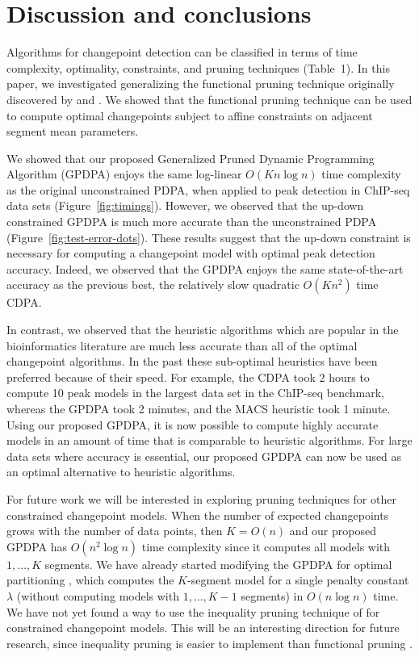 \documentclass{article}
\begin{document}
\section{Discussion and conclusions}
\label{sec:discussion}

Algorithms for changepoint detection can be classified in terms of
time complexity, optimality, constraints, and pruning techniques
(Table~1). In this paper, we investigated generalizing the functional
pruning technique originally discovered by \citet{pruned-dp} and
\citet{johnson}. We showed that the functional pruning technique can
be used to compute optimal changepoints subject to affine constraints
on adjacent segment mean parameters.

We showed that our proposed Generalized Pruned Dynamic Programming
Algorithm (GPDPA) enjoys the same log-linear $O(Kn\log n)$ time
complexity as the original unconstrained PDPA, when applied to peak
detection in ChIP-seq data sets (Figure~\ref{fig:timings}). However,
we observed that the up-down constrained GPDPA is much more accurate
than the unconstrained PDPA (Figure~\ref{fig:test-error-dots}). These
results suggest that the up-down constraint is necessary for computing
a changepoint model with optimal peak detection accuracy. Indeed, we
observed that the GPDPA enjoys the same state-of-the-art accuracy as
the previous best, the relatively slow quadratic $O(Kn^2)$ time
CDPA.

In contrast, we observed that the heuristic algorithms which are
popular in the bioinformatics literature are much less accurate than
all of the optimal changepoint algorithms. In the past these
sub-optimal heuristics have been preferred because of their speed. For
example, the CDPA took 2 hours to compute 10 peak models in the
largest data set in the ChIP-seq benchmark, whereas the GPDPA took 2
minutes, and the MACS heuristic took 1 minute. Using our proposed
GPDPA, it is now possible to compute highly accurate models in an
amount of time that is comparable to heuristic algorithms. For large
data sets where accuracy is essential, our proposed GPDPA can now be
used as an optimal alternative to heuristic algorithms.

For future work we will be interested in exploring pruning techniques
for other constrained changepoint models. When the number of expected
changepoints grows with the number of data points, then $K=O(n)$ and
our proposed GPDPA has $O(n^2 \log n)$ time complexity since it
computes all models with $1,\dots,K$ segments. We have already started
modifying the GPDPA for optimal partitioning
\citep{optimal-partitioning}, which computes the $K$-segment model for
a single penalty constant $\lambda$ (without computing models with
$1,\dots,K-1$ segments) in $O(n\log n)$ time. We have not yet found a
way to use the inequality pruning technique of \citet{pelt} for
constrained changepoint models. This will be an interesting direction
for future research, since inequality pruning is easier to implement
than functional pruning \citep{fpop}.


\newpage

\end{document}
